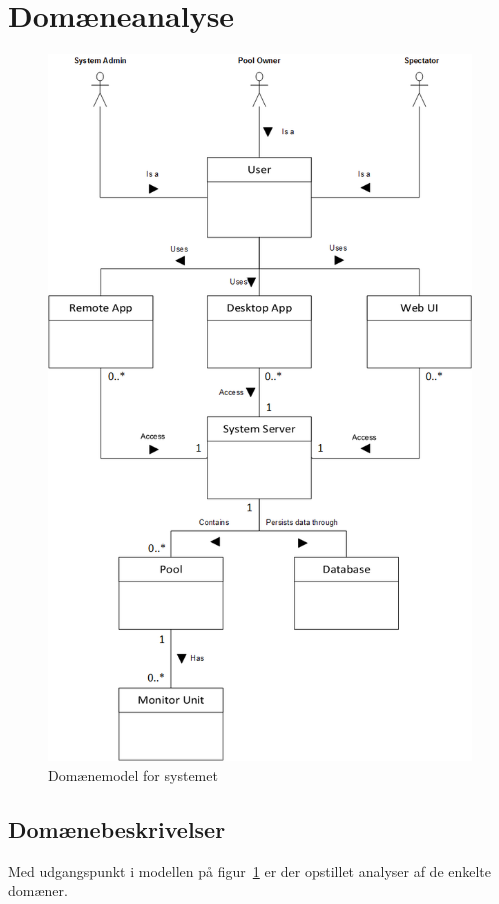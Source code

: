 \section{Domæneanalyse}

\begin{figure}
	\centering
	\includegraphics[width=0.8\linewidth]{figs/domainModel}
	\caption{Domænemodel for systemet}
	\label{fig:domainmodel}
\end{figure}


\subsection{Domænebeskrivelser}
Med udgangspunkt i modellen på figur~\ref{fig:domainmodel} er der opstillet analyser af de enkelte domæner.

